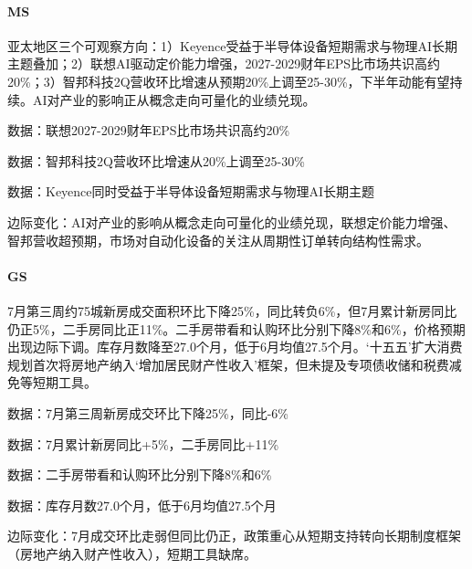 \documentclass[11pt]{ctexart}
\begin{document}
\paragraph{MS} 亚太地区三个可观察方向：1）Keyence受益于半导体设备短期需求与物理AI长期主题叠加；2）联想AI驱动定价能力增强，2027-2029财年EPS比市场共识高约20\%；3）智邦科技2Q营收环比增速从预期20\%上调至25-30\%，下半年动能有望持续。AI对产业的影响正从概念走向可量化的业绩兑现。
{\small\color{refgray}数据：联想2027-2029财年EPS比市场共识高约20\%\par}
{\small\color{refgray}数据：智邦科技2Q营收环比增速从20\%上调至25-30\%\par}
{\small\color{refgray}数据：Keyence同时受益于半导体设备短期需求与物理AI长期主题\par}
{\small\color{refgray}边际变化：AI对产业的影响从概念走向可量化的业绩兑现，联想定价能力增强、智邦营收超预期，市场对自动化设备的关注从周期性订单转向结构性需求。\par}
\paragraph{GS} 7月第三周约75城新房成交面积环比下降25\%，同比转负6\%，但7月累计新房同比仍正5\%，二手房同比正11\%。二手房带看和认购环比分别下降8\%和6\%，价格预期出现边际下调。库存月数降至27.0个月，低于6月均值27.5个月。‘十五五’扩大消费规划首次将房地产纳入‘增加居民财产性收入’框架，但未提及专项债收储和税费减免等短期工具。
{\small\color{refgray}数据：7月第三周新房成交环比下降25\%，同比-6\%\par}
{\small\color{refgray}数据：7月累计新房同比+5\%，二手房同比+11\%\par}
{\small\color{refgray}数据：二手房带看和认购环比分别下降8\%和6\%\par}
{\small\color{refgray}数据：库存月数27.0个月，低于6月均值27.5个月\par}
{\small\color{refgray}边际变化：7月成交环比走弱但同比仍正，政策重心从短期支持转向长期制度框架（房地产纳入财产性收入），短期工具缺席。\par}
\end{document}
